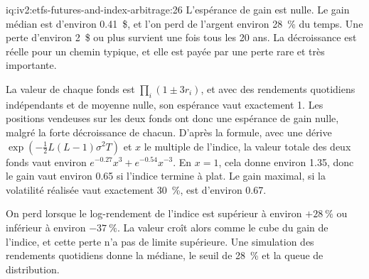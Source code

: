 \begin{solution}{iq:iv2:etfs-futures-and-index-arbitrage:26}
L'espérance de gain est nulle. Le gain médian est d'environ 0.41~\$, et l'on perd de l'argent environ 28~\% du temps. Une perte d'environ 2~\$ ou plus survient une fois tous les 20 ans. La décroissance est réelle pour un chemin typique, et elle est payée par une perte rare et très importante.

La valeur de chaque fonds est $\prod_i(1 \pm 3r_i)$, et avec des rendements quotidiens indépendants et de moyenne nulle, son espérance vaut exactement 1. Les positions vendeuses sur les deux fonds ont donc une espérance de gain nulle, malgré la forte décroissance de chacun. D'après la formule, avec une dérive $\exp(-\tfrac12L(L - 1)\sigma^2T)$ et $x$ le multiple de l'indice, la valeur totale des deux fonds vaut environ $e^{-0.27}x^3 + e^{-0.54}x^{-3}$. En $x = 1$, cela donne environ 1.35, donc le gain vaut environ 0.65 si l'indice termine à plat. Le gain maximal, si la volatilité réalisée vaut exactement 30~\%, est d'environ 0.67.

On perd lorsque le log-rendement de l'indice est supérieur à environ $+28~\%$ ou inférieur à environ $-37~\%$. La valeur croît alors comme le cube du gain de l'indice, et cette perte n'a pas de limite supérieure. Une simulation des rendements quotidiens donne la médiane, le seuil de 28~\% et la queue de distribution.

\end{solution}

